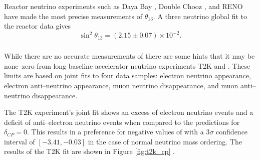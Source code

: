 {\subsubsection*{}

Reactor neutrino experiments such as Daya Bay \cite{An:2012eh}, Double Chooz
\cite{Abe:2013sxa}, and RENO \cite{Ahn:2012nd} have made the most precise measurements of
$\theta_{13}$. A three neutrino global fit to the reactor data gives 
\cite{Capozzi:2016rtj}
\begin{equation}
	\sin^2 \theta_{13} = (2.15 \pm 0.07) \times 10^{-2}.
	\label{eqn:theta_13}
\end{equation}


\subsubsection*{}
While there are no accurate measurements of \dcp{} there are some hints that it
may be none--zero from long baseline accelerator neutrino experiments T2K and
\nova{}. These limits are based on joint fits to four data samples: electron
neutrino appearance, electron anti--neutrino appearance, muon neutrino
disappearance, and muon anti--neutrino disappearance.

The T2K experiment's joint fit shows an excess of electron neutrino events and 
a deficit of anti--electron neutrino events when compared to the predictions 
for \(\delta_{CP} = 0\). This results in a preference for negative values of 
\dcp{} with a \(3\sigma\) confidence interval of \([-3.41, -0.03]\) in the 
case of normal neutrino mass ordering. The results of the T2K fit are shown 
in Figure \ref{fig:t2k_cp} \cite{Abe2019}.

}
